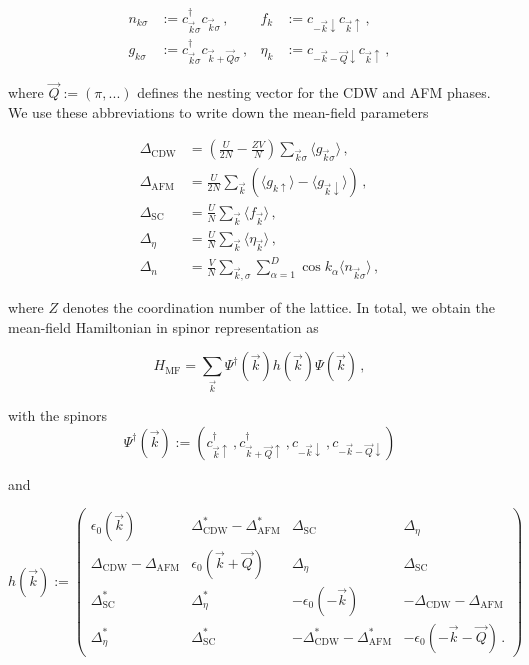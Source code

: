 \documentclass[
    reprint, 
    aps,
    preprintnumbers,
    twocolumn,
    prb,
    superscriptaddress
]{revtex4-2}
\newcommand{\vk}{\vec{k}}
\newcommand{\vQ}{\vec{Q}}
\newcommand{\up}{\uparrow}
\newcommand{\down}{\downarrow}
\newcommand{\kplusQ}{\vk+\vQ}
\newcommand{\kminusQ}{-\vk-\vQ}
\begin{document}
\begin{equation}
    \begin{aligned}
        n_{k\sigma} &:= c_{\vk\sigma}^\dagger c_{\vk\sigma}\,,      &f_k     &:= c_{-\vk\down} c_{\vk\up}\,, \\
        g_{k\sigma} &:= c_{\vk\sigma}^\dagger c_{\vk+\vQ\sigma}\,,  &\eta_k  &:= c_{-\vk-\vQ\down} c_{\vk\up}\,,
    \end{aligned}
\end{equation}

where $\vQ := (\pi, ...)$ defines the nesting vector for the CDW and AFM phases.
We use these abbreviations to write down the mean-field parameters

\begin{subequations}
    \begin{align}
        \Delta_\text{CDW} &= \left(\frac{U}{2N} - \frac{ZV}{N}\right) \sum_{\vk\sigma} \langle g_{\vk\sigma} \rangle\,, \\
        \Delta_\text{AFM} &= \frac{U}{2N} \sum_{\vk} \left( \langle g_{k\uparrow} \rangle - \langle g_{\vk\downarrow} \rangle \right)\,, \\
        \Delta_\text{SC} &= \frac{U}{N} \sum_{\vk} \langle f_{\vk} \rangle\,, \\
        \Delta_\eta &= \frac{U}{N} \sum_{\vk} \langle \eta_{\vk} \rangle\,, \\
        \Delta_n &= \frac{V}{N} \sum_{\vk,\sigma} \sum_{\alpha=1}^D \cos k_\alpha \langle n_{\vk\sigma} \rangle\,,
    \end{align}
\end{subequations}

where $Z$ denotes the coordination number of the lattice.
In total, we obtain the mean-field Hamiltonian in spinor representation as

\begin{equation}
    H_\text{MF} = \sum_{\vk} \Psi^\dagger (\vk) h(\vk) \Psi (\vk)\,,
\end{equation}

with the spinors
\begin{equation}
    \Psi^\dagger (\vk) := \left( c_{\vk\up}^\dagger\,, c_{\kplusQ\up}^\dagger\,, c_{-\vk\down}\,, c_{\kminusQ\down} \right)
\end{equation}

and 

\begin{widetext}
\begin{equation}
    h(\vk) := \begin{pmatrix}
        \epsilon_0 (\vk) & \Delta_\text{CDW}^* - \Delta_\text{AFM}^* & \Delta_\text{SC} & \Delta_\eta \\
        \Delta_\text{CDW} - \Delta_\text{AFM} & \epsilon_0 (\vk + \vQ) & \Delta_\eta & \Delta_\text{SC} \\
        \Delta_\text{SC}^* & \Delta_\eta^* & - \epsilon_0 (-\vk) & - \Delta_\text{CDW} - \Delta_\text{AFM} \\
        \Delta_\eta^* & \Delta_\text{SC}^* & - \Delta_\text{CDW}^* - \Delta_\text{AFM}^* & - \epsilon_0 (-\vk - \vQ)\,.
        \end{pmatrix}
\end{equation}
\end{widetext}
\end{document}
